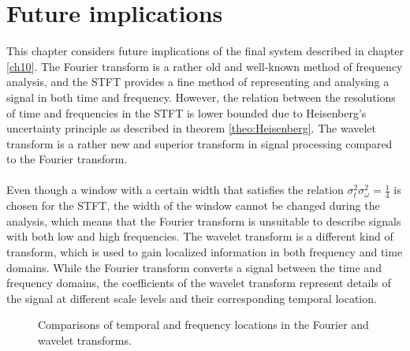 \chapter{Future implications} \label{ch14}
This chapter considers future implications of the final system described in chapter \ref{ch10}. The Fourier transform is a rather old and well-known method of frequency analysis, and the STFT provides a fine method of representing and analysing a signal in both time and frequency. However, the relation between the resolutions of time and frequencies in the STFT is lower bounded due to Heisenberg's uncertainty principle as described in theorem \ref{theo:Heisenberg}. The wavelet transform is a rather new and superior transform in signal processing compared to the Fourier transform.
\\ \\
Even though a window with a certain width that satisfies the relation $\sigma_t^2 \sigma_\omega^2 = \frac{1}{4}$ is chosen for the STFT, the width of the window cannot be changed during the analysis, which means that the Fourier transform is unsuitable to describe signals with both low and high frequencies. The wavelet transform is a different kind of transform, which is used to gain localized information in both frequency and time domains. While the Fourier transform converts a signal between the time and frequency domains, the coefficients of the wavelet transform represent details of the signal at different scale levels and their corresponding temporal location.
\begin{figure}[H]
\hspace*{-0.7cm}
\centering
{}
\caption{Comparisons of temporal and frequency locations in the Fourier and wavelet transforms.}
\label{fig:wave}
\end{figure}

